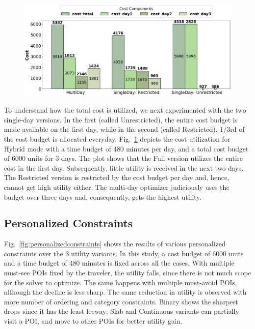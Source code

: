 \begin{figure}[t]
\centering
\includegraphics[width=\figwidth]{plots/costbreakdown.png}
\label{fig:multi-day-cost-breakdown}
\end{figure}

To understand how the total cost is utilized, we next experimented with the two single-day versions. In the first (called Unrestricted), the entire cost budget is made available on the first day, while in the second (called Restricted), 1/3rd of the cost budget is allocated everyday.
Fig.~\ref{fig:multi-day-cost-breakdown} depicts the cost utilization for Hybrid mode with a time budget of 480 minutes per day, and a total cost budget of 6000 units for 3 days. The plot shows that the Full version utilizes the entire cost in the first day. Subsequently, little utility is received in the next two days.
The Restricted version is restricted by the cost budget per day and, hence, cannot get high utility either.
The \trip multi-day optimizer judiciously uses the budget over three days and, consequently, gets the highest utility.

\subsection{Personalized Constraints}
\label{sec:exp personalized constraints}

Fig.~\ref{fig:personalizedconstraints} shows the results of various personalized constraints over the 3 utility variants.
In this study, a cost budget of 6000 units and a time budget of 480 minutes is fixed across all the cases.
With multiple must-see POIs fixed by the traveler, the utility falls, since there is not much scope for the solver to optimize. The same happens with multiple must-avoid POIs, although the decline is less sharp.
The same reduction in utility is observed with more number of ordering and category constraints.
Binary shows the sharpest drops since it has the least leeway; Slab and Continuous variants can partially visit a POI, and move to other POIs for better utility gain.

